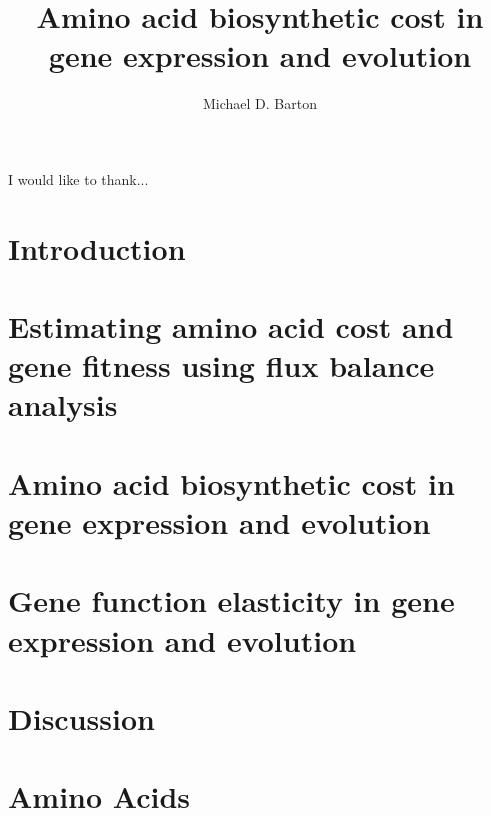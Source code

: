 \documentclass[12pt,PhD]{muthesis}
\begin{document}
\title{Amino acid biosynthetic cost in gene expression and evolution}
\author{Michael D. Barton}

\beforeabstract

\printnomenclature[1.5cm]


\afterabstract

I would like to thank...
\afterpreface

\chapter{Introduction}

\chapter{Estimating amino acid cost and gene fitness using flux balance analysis}

\chapter{Amino acid biosynthetic cost in gene expression and evolution}

\chapter{Gene function elasticity in gene expression and evolution}

\chapter{Discussion}





\appendix
\addappheadtotoc
\appendixpage
\chapter{Amino Acids}

\end{document}
